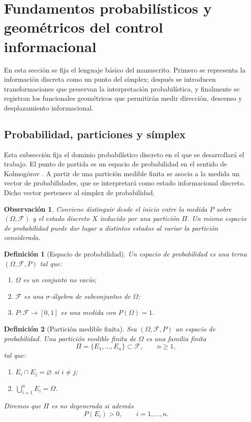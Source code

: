 \documentclass[12pt]{article}
\newtheorem{definicion}{Definición}[section]
\newtheorem{observacion}{Observación}[section]
\begin{document}
\section{Fundamentos probabilísticos y geométricos del control informacional}

En esta sección se fija el lenguaje básico del manuscrito. Primero se representa la información discreta como un punto del símplex; después se introducen transformaciones que preservan la interpretación probabilística, y finalmente se registran los funcionales geométricos que permitirán medir dirección, descenso y desplazamiento informacional.

\subsection{Probabilidad, particiones y símplex}

Esta subsección fija el dominio probabilístico discreto en el que se desarrollará el trabajo. El punto de partida es un espacio de probabilidad en el sentido de Kolmogórov \citep{Kolmogorov1933}. A partir de una partición medible finita se asocia a la medida un vector de probabilidades, que se interpretará como estado informacional discreto. Dicho vector pertenece al símplex de probabilidad.

\begin{observacion}
Conviene distinguir desde el inicio entre la medida $P$ sobre $(\Omega,\mathcal F)$ y el estado discreto $X$ inducido por una partición $\Pi$. Un mismo espacio de probabilidad puede dar lugar a distintos estados al variar la partición considerada.
\end{observacion}

\begin{definicion}[Espacio de probabilidad]\label{def:espacio_prob}
Un \emph{espacio de probabilidad} es una terna $(\Omega,\mathcal F,P)$ tal que:
\begin{enumerate}
    \item $\Omega$ es un conjunto no vacío;
    \item $\mathcal F$ es una $\sigma$-álgebra de subconjuntos de $\Omega$;
    \item $P:\mathcal F\to[0,1]$ es una medida con $P(\Omega)=1$.
\end{enumerate}
\end{definicion}

\begin{definicion}[Partición medible finita]\label{def:particion}
Sea $(\Omega,\mathcal F,P)$ un espacio de probabilidad. Una \emph{partición medible finita} de $\Omega$ es una familia finita
\[
\Pi=\{E_1,\dots,E_n\}\subset \mathcal F,\qquad n\ge 1,
\]
tal que:
\begin{enumerate}
    \item $E_i\cap E_j=\varnothing$ si $i\neq j$;
    \item $\bigcup_{i=1}^n E_i=\Omega$.
\end{enumerate}

Diremos que $\Pi$ es \emph{no degenerada} si además
\[
P(E_i)>0,\qquad i=1,\dots,n.
\]
\end{definicion}
\end{document}
